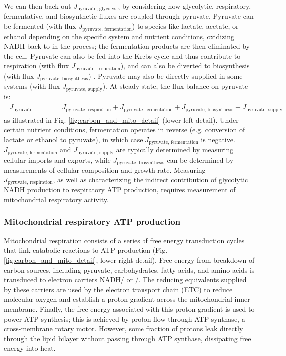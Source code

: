 \documentclass{compactarticle}
\begin{document}
We can then back out $J_\text{pyruvate, glycolysis}$ by considering how glycolytic, respiratory, fermentative, and biosynthetic fluxes are coupled through pyruvate. Pyruvate can be fermented (with flux $ J_\text{pyruvate, fermentation} $) to species like lactate, acetate, or ethanol depending on the specific system and nutrient conditions, oxidizing NADH back to  in the process; the fermentation products are then eliminated by the cell. Pyruvate can also be fed into the Krebs cycle and thus contribute to respiration (with flux $ J_\text{pyruvate, respiration} $), and can also be diverted to biosynthesis (with flux $J_\text{pyruvate, biosynthesis}$) \cite{fraenkel2011yeast}. Pyruvate may also be directly supplied in some systems (with flux $ J_\text{pyruvate, supply} $). At steady state, the flux balance on pyruvate is:
\begin{align}
    \begin{split}
        J_\text{pyruvate, glycolysis} &= J_\text{pyruvate, respiration} + J_\text{pyruvate, fermentation} + J_\text{pyruvate, biosynthesis} - J_\text{pyruvate, supply}
    \end{split}
    \label{eq:pyruvatebalance}
\end{align}
\noindent as illustrated in Fig. \ref{fig:carbon_and_mito_detail} (lower left detail). Under certain nutrient conditions, fermentation operates in reverse (e.g. conversion of lactate or ethanol to pyruvate), in which case $ J_\text{pyruvate, fermentation} $ is negative. $ J_\text{pyruvate, fermentation} $ and $ J_\text{pyruvate, supply} $ are typically determined by measuring cellular imports and exports, while $ J_\text{pyruvate, biosynthesis} $ can be determined by measurements of cellular composition and growth rate. Measuring $ J_\text{pyruvate, respiration} $, as well as characterizing the indirect contribution of glycolytic NADH production to respiratory ATP production, requires measurement of mitochondrial respiratory activity.

\subsubsection{Mitochondrial respiratory ATP production}
\label{sec:respATPprod}

Mitochondrial respiration consists of a series of free energy transduction cycles that link catabolic reactions to ATP production \cite{salway2016metabolism} (Fig. \ref{fig:carbon_and_mito_detail}, lower right detail). Free energy from breakdown of carbon sources, including pyruvate, carbohydrates, fatty acids, and amino acids is transduced to electron carriers NADH/ or /. The reducing equivalents supplied by these carriers are used by the electron transport chain (ETC) to reduce molecular oxygen and establish a proton gradient across the mitochondrial inner membrane. Finally, the free energy associated with this proton gradient is used to power ATP synthesis; this is achieved by proton flow through ATP synthase, a cross-membrane rotary motor. However, some fraction of protons leak directly through the lipid bilayer without passing through ATP synthase, dissipating free energy into heat.
\end{document}
